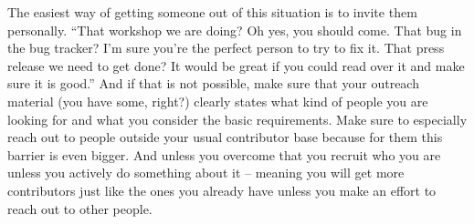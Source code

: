The easiest way of getting someone out of this situation is to invite them personally. ``That workshop we are doing? Oh yes, you should come. That bug in the bug tracker? I'm sure you're the perfect person to try to fix it. That press release we need to get done? It would be great if you could read over it and make sure it is good.'' And if that is not possible, make sure that your outreach material (you have some, right?) clearly states what kind of people you are looking for and what you consider the basic requirements. Make sure to especially reach out to people outside your usual contributor base because for them this barrier is even bigger. And unless you overcome that you recruit who you are unless you actively do something about it -- meaning you will get more contributors just like the ones you already have unless you make an effort to reach out to other people.
